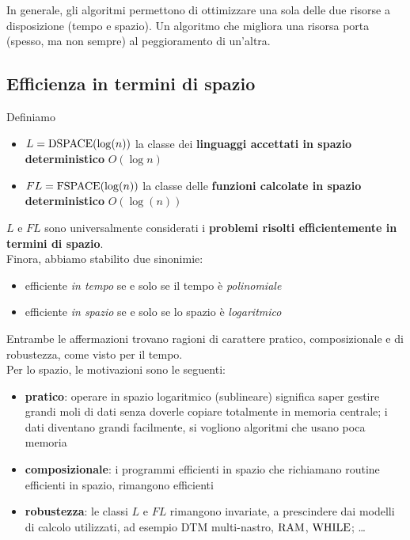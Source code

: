 In generale, gli algoritmi permettono di ottimizzare una sola delle due risorse a disposizione (tempo e spazio). Un algoritmo che migliora una risorsa porta (spesso, ma non sempre) al peggioramento di un'altra.\\

\subsection{Efficienza in termini di spazio}

Definiamo 
\begin{itemize}
	\item $L = \text{DSPACE} (\log (n))$ la classe dei \textbf{linguaggi accettati in spazio deterministico} $O(\log n)$
	\item $FL = \text{FSPACE} (\log (n))$ la classe delle \textbf{funzioni calcolate in spazio deterministico} $O(\log (n))$
\end{itemize}

$L$ e $FL$ sono universalmente considerati i \textbf{problemi risolti efficientemente in termini di spazio}.\\

Finora, abbiamo stabilito due sinonimie:
\begin{itemize}
	\item efficiente \textit{in tempo} se e solo se il tempo è \textit{polinomiale}
	\item efficiente \textit{in spazio} se e solo se lo spazio è \textit{logaritmico}
\end{itemize}

Entrambe le affermazioni trovano ragioni di carattere pratico, composizionale e di robustezza, come visto per il tempo.\\

Per lo spazio, le motivazioni sono le seguenti:
\begin{itemize}
	\item \textbf{pratico}: operare in spazio logaritmico (sublineare) significa saper gestire grandi moli di dati senza doverle copiare totalmente in memoria centrale; i dati diventano grandi facilmente, si vogliono algoritmi che usano poca memoria
	\item \textbf{composizionale}: i programmi efficienti in spazio che richiamano routine efficienti in spazio, rimangono efficienti
	\item \textbf{robustezza}: le classi $L$ e $FL$ rimangono invariate, a prescindere dai modelli di calcolo utilizzati, ad esempio DTM multi-nastro, $\text{RAM}$, $\text{WHILE}$; \dots
\end{itemize}

